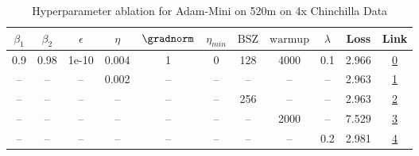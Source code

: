\begin{table}[H]
\centering
\caption{Hyperparameter ablation for Adam-Mini on 520m on 4x Chinchilla Data}
\label{tab:ablation_adam-mini_520m_on_4x_chinchilla_data}
\begin{tabular}{ccccccccccc}
\toprule
$\beta_1$ & $\beta_2$ & $\epsilon$ & $\eta$ & $\gradnorm$ & $\eta_{min}$ & $\mathrm{BSZ}$ & $\mathrm{warmup}$ & $\lambda$ & Loss & Link \\
\midrule
0.9 & 0.98 & 1e-10 & 0.004 & 1 & 0 & 128 & 4000 & 0.1 & 2.966 & \href{https://wandb.ai/stanford-mercury/optimizer-scaling/runs/sweep-520m-42B-minikdfe5aclr0.004-wd0.1-minlr0-warmup4000-b10.9--5de7af}{0} \\
\midrule
-- & -- & -- & 0.002 & -- & -- & -- & -- & -- & 2.963 & \href{https://wandb.ai/stanford-mercury/optimizer-scaling/runs/sweep-520m-42B-minik6bf656lr0.002-wd0.1-minlr0-warmup4000-b10.9--a9507c}{1} \\
-- & -- & -- & -- & -- & -- & 256 & -- & -- & 2.963 & \href{https://wandb.ai/stanford-mercury/optimizer-scaling/runs/sweep-520m-42B-minik4e584elr0.004-wd0.1-minlr0-warmup4000-b10.9--3eca5c}{2} \\
-- & -- & -- & -- & -- & -- & -- & 2000 & -- & 7.529 & \href{https://wandb.ai/stanford-mercury/optimizer-scaling/runs/sweep-520m-42B-minikb765f6lr0.004-wd0.1-minlr0-warmup2000-b10.9--520ca1}{3} \\
-- & -- & -- & -- & -- & -- & -- & -- & 0.2 & 2.981 & \href{https://wandb.ai/stanford-mercury/optimizer-scaling/runs/sweep-520m-42B-miniba6697lr0.004-wd0.2-minlr0-warmup4000-b10.9-b-2db890}{4} \\
\bottomrule
\end{tabular}
\end{table}

